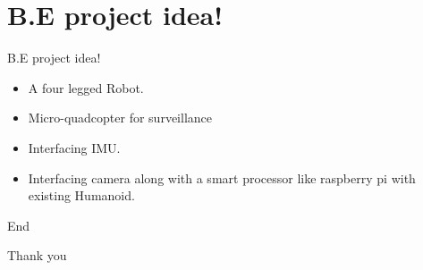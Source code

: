 \documentclass{beamer}
\begin{document}
\section{B.E project idea!}
\begin{frame}{B.E project idea!}
	\begin{itemize}
	\item A four legged Robot.
	\item Micro-quadcopter for surveillance
	\item Interfacing IMU.
	\item Interfacing camera along with a smart processor like raspberry pi with existing Humanoid. 
	\end{itemize}
	
	
\end{frame}



\begin{frame}{End}
	\centering
	
	\Huge{Thank you}
\end{frame}
\end{document}
